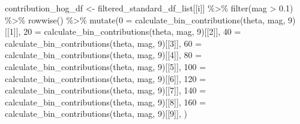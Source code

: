 \documentclass[
  letterpaper,
]{report}
\newenvironment{Shaded}{\begin{snugshade}}{\end{snugshade}}
\newcommand{\AttributeTok}[1]{\textcolor[rgb]{0.40,0.45,0.13}{#1}}
\newcommand{\DecValTok}[1]{\textcolor[rgb]{0.68,0.00,0.00}{#1}}
\newcommand{\FloatTok}[1]{\textcolor[rgb]{0.68,0.00,0.00}{#1}}
\newcommand{\FunctionTok}[1]{\textcolor[rgb]{0.28,0.35,0.67}{#1}}
\newcommand{\NormalTok}[1]{\textcolor[rgb]{0.00,0.23,0.31}{#1}}
\newcommand{\OtherTok}[1]{\textcolor[rgb]{0.00,0.23,0.31}{#1}}
\newcommand{\SpecialCharTok}[1]{\textcolor[rgb]{0.37,0.37,0.37}{#1}}
\newcommand{\StringTok}[1]{\textcolor[rgb]{0.13,0.47,0.30}{#1}}
\begin{document}
\begin{Shaded}
\begin{Highlighting}[]
\NormalTok{  contribution\_hog\_df }\OtherTok{\textless{}{-}} 
\NormalTok{    filtered\_standard\_df\_list[[i]] }\SpecialCharTok{\%\textgreater{}\%}
    \FunctionTok{filter}\NormalTok{(mag }\SpecialCharTok{\textgreater{}} \FloatTok{0.1}\NormalTok{) }\SpecialCharTok{\%\textgreater{}\%}
    \FunctionTok{rowwise}\NormalTok{() }\SpecialCharTok{\%\textgreater{}\%}
    \FunctionTok{mutate}\NormalTok{(}\StringTok{\textasciigrave{}}\AttributeTok{0}\StringTok{\textasciigrave{}} \OtherTok{=} \FunctionTok{calculate\_bin\_contributions}\NormalTok{(theta, mag, }\DecValTok{9}\NormalTok{)[[}\DecValTok{1}\NormalTok{]],}
           \StringTok{\textasciigrave{}}\AttributeTok{20}\StringTok{\textasciigrave{}} \OtherTok{=} \FunctionTok{calculate\_bin\_contributions}\NormalTok{(theta, mag, }\DecValTok{9}\NormalTok{)[[}\DecValTok{2}\NormalTok{]],}
           \StringTok{\textasciigrave{}}\AttributeTok{40}\StringTok{\textasciigrave{}} \OtherTok{=} \FunctionTok{calculate\_bin\_contributions}\NormalTok{(theta, mag, }\DecValTok{9}\NormalTok{)[[}\DecValTok{3}\NormalTok{]],}
           \StringTok{\textasciigrave{}}\AttributeTok{60}\StringTok{\textasciigrave{}} \OtherTok{=} \FunctionTok{calculate\_bin\_contributions}\NormalTok{(theta, mag, }\DecValTok{9}\NormalTok{)[[}\DecValTok{4}\NormalTok{]],}
           \StringTok{\textasciigrave{}}\AttributeTok{80}\StringTok{\textasciigrave{}} \OtherTok{=} \FunctionTok{calculate\_bin\_contributions}\NormalTok{(theta, mag, }\DecValTok{9}\NormalTok{)[[}\DecValTok{5}\NormalTok{]],}
           \StringTok{\textasciigrave{}}\AttributeTok{100}\StringTok{\textasciigrave{}} \OtherTok{=} \FunctionTok{calculate\_bin\_contributions}\NormalTok{(theta, mag, }\DecValTok{9}\NormalTok{)[[}\DecValTok{6}\NormalTok{]],}
           \StringTok{\textasciigrave{}}\AttributeTok{120}\StringTok{\textasciigrave{}} \OtherTok{=} \FunctionTok{calculate\_bin\_contributions}\NormalTok{(theta, mag, }\DecValTok{9}\NormalTok{)[[}\DecValTok{7}\NormalTok{]],}
           \StringTok{\textasciigrave{}}\AttributeTok{140}\StringTok{\textasciigrave{}} \OtherTok{=} \FunctionTok{calculate\_bin\_contributions}\NormalTok{(theta, mag, }\DecValTok{9}\NormalTok{)[[}\DecValTok{8}\NormalTok{]],}
           \StringTok{\textasciigrave{}}\AttributeTok{160}\StringTok{\textasciigrave{}} \OtherTok{=} \FunctionTok{calculate\_bin\_contributions}\NormalTok{(theta, mag, }\DecValTok{9}\NormalTok{)[[}\DecValTok{9}\NormalTok{]],}
\NormalTok{           )}
  

\end{Highlighting}
\end{Shaded}
\end{document}
